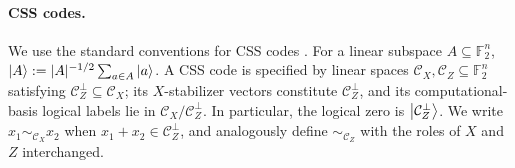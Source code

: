 \paragraph{CSS codes.}
We use the standard conventions for CSS codes \cite{Calderbank_1996,Steane_1996}. For a linear subspace $A\subseteq\mathbb F_2^n$, $\ket A:=|A|^{-1/2}\sum_{a\in A}\ket a$. A CSS code is specified by linear spaces $\mathcal C_X,\mathcal C_Z\subseteq\mathbb F_2^n$ satisfying $\mathcal C_Z^\perp\subseteq\mathcal C_X$; its $X$-stabilizer vectors constitute $\mathcal C_Z^\perp$, and its computational-basis logical labels lie in $\mathcal C_X/\mathcal C_Z^\perp$. In particular, the logical zero is $\ket{\mathcal C_Z^\perp}$. We write $x_1\sim_{\mathcal C_X}x_2$ when $x_1+x_2\in\mathcal C_Z^\perp$, and analogously define $\sim_{\mathcal C_Z}$ with the roles of $X$ and $Z$ interchanged.
